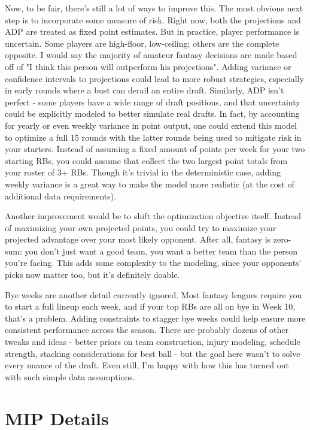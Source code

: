 \documentclass{article}
\begin{document}
Now, to be fair, there's still a lot of ways to improve this.
The most obvious next step is to incorporate some measure of risk.
Right now, both the projections and ADP are treated as fixed point estimates.
But in practice, player performance is uncertain. Some players are high-floor, low-ceiling; others are the complete opposite.
I would say the majority of amateur fantasy decisions  are made based off of "I think this person will outperform his projections".
Adding variance or confidence intervals to projections could lead to more robust strategies, especially in early rounds where a bust can derail an entire draft.
Similarly, ADP isn't perfect - some players have a wide range of draft positions, and that uncertainty could be explicitly modeled to better simulate real drafts.
In fact, by accounting for yearly or even weekly variance in point output, one could extend this model to optimize a full 15 rounds with the latter rounds being used to mitigate risk in your starters.
Instead of assuming a fixed amount of points per week for your two starting RBs, you could assume that collect the two largest point totals from your roster of 3+ RBs.
Though it's trivial in the deterministic case, adding weekly variance is a great way to make the model more realistic (at the cost of additional data requirements).

Another improvement would be to shift the optimization objective itself.
Instead of maximizing your own projected points, you could try to maximize your projected advantage over your most likely opponent.
After all, fantasy is zero-sum: you don't just want a good team, you want a better team than the person you're facing.
This adds some complexity to the modeling, since your opponents' picks now matter too, but it's definitely doable.

Bye weeks are another detail currently ignored.
Most fantasy leagues require you to start a full lineup each week, and if your top RBs are all on bye in Week 10, that's a problem.
Adding constraints to stagger bye weeks could help ensure more consistent performance across the season.
There are probably dozens of other tweaks and ideas - better priors on team construction, injury modeling, schedule strength, stacking considerations for best ball - but the goal here wasn't to solve every nuance of the draft.
Even still, I'm happy with how this has turned out with such simple data assumptions.

\appendix
\section{MIP Details}\label{sec:appendix}
\end{document}
